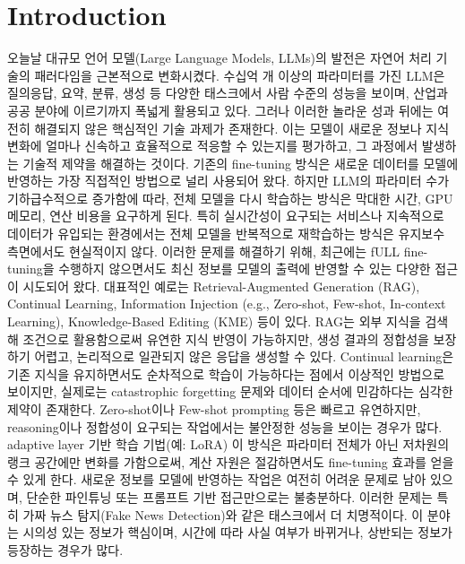 \documentclass[a4paper,fleqn]{cas-sc}
\begin{document}
\section{Introduction}

오늘날 대규모 언어 모델(Large Language Models, LLMs)의 발전은 자연어 처리 기술의 패러다임을 근본적으로 변화시켰다. 
수십억 개 이상의 파라미터를 가진 LLM은 질의응답, 요약, 분류, 생성 등 다양한 태스크에서 사람 수준의 성능을 보이며, 산업과 공공 분야에 이르기까지 폭넓게 활용되고 있다. 
그러나 이러한 놀라운 성과 뒤에는 여전히 해결되지 않은 핵심적인 기술 과제가 존재한다. 
이는 모델이 새로운 정보나 지식 변화에 얼마나 신속하고 효율적으로 적응할 수 있는지를 평가하고, 그 과정에서 발생하는 기술적 제약을 해결하는 것이다.
기존의 fine-tuning 방식은 새로운 데이터를 모델에 반영하는 가장 직접적인 방법으로 널리 사용되어 왔다. 
하지만 LLM의 파라미터 수가 기하급수적으로 증가함에 따라, 전체 모델을 다시 학습하는 방식은 막대한 시간, GPU 메모리, 연산 비용을 요구하게 된다. 
특히 실시간성이 요구되는 서비스나 지속적으로 데이터가 유입되는 환경에서는 전체 모델을 반복적으로 재학습하는 방식은 유지보수 측면에서도 현실적이지 않다. 
이러한 문제를 해결하기 위해, 최근에는 fULL fine-tuning을 수행하지 않으면서도 최신 정보를 모델의 출력에 반영할 수 있는 다양한 접근이 시도되어 왔다. 
대표적인 예로는 Retrieval-Augmented Generation (RAG), Continual Learning, Information Injection (e.g., Zero-shot, Few-shot, In-context Learning), Knowledge-Based Editing (KME) 등이 있다.
RAG는 외부 지식을 검색해 조건으로 활용함으로써 유연한 지식 반영이 가능하지만, 생성 결과의 정합성을 보장하기 어렵고, 논리적으로 일관되지 않은 응답을 생성할 수 있다. 
Continual learning은 기존 지식을 유지하면서도 순차적으로 학습이 가능하다는 점에서 이상적인 방법으로 보이지만, 실제로는 catastrophic forgetting 문제와 데이터 순서에 민감하다는 심각한 제약이 존재한다. 
Zero-shot이나 Few-shot prompting 등은 빠르고 유연하지만, reasoning이나 정합성이 요구되는 작업에서는 불안정한 성능을 보이는 경우가 많다.
adaptive layer 기반 학습 기법(예: LoRA)  이 방식은 파라미터 전체가 아닌 저차원의 랭크 공간에만 변화를 가함으로써, 계산 자원은 절감하면서도 fine-tuning 효과를 얻을 수 있게 한다.
새로운 정보를 모델에 반영하는 작업은 여전히 어려운 문제로 남아 있으며, 단순한 파인튜닝 또는 프롬프트 기반 접근만으로는 불충분하다.
이러한 문제는 특히 가짜 뉴스 탐지(Fake News Detection)와 같은 태스크에서 더 치명적이다. 
이 분야는 시의성 있는 정보가 핵심이며, 시간에 따라 사실 여부가 바뀌거나, 상반되는 정보가 등장하는 경우가 많다. 
\end{document}
